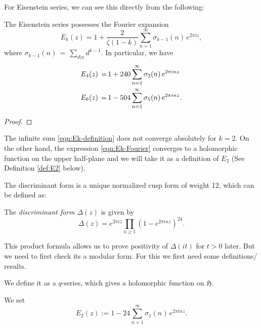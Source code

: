 For Eisenstein series, we can see this directly from the following:

\begin{lemma}\label{lemma:Ek-Fourier}\leanok
The Eisenstein series possesses the Fourier expansion
\begin{equation}\label{eqn:Ek-Fourier}E_k(z)=1+\frac{2}{\zeta(1-k)}\sum_{n=1}^\infty \sigma_{k-1}(n)\,e^{2\pi i z}, \end{equation}
where $\sigma_{k-1}(n)\,=\,\sum_{d|n} d^{k-1}$. In particular, we have
\begin{align}
  E_4(z)\,=\,& 1+240\sum_{n=1}^\infty \sigma_3(n)\,e^{2\pi i n z} \notag \\
  E_6(z)\,=\,& 1-504\sum_{n=1}^\infty \sigma_5(n)\,e^{2\pi i n z}. \notag
\end{align}
\end{lemma}

\begin{proof}
\leanok
\end{proof}

The infinite sum \eqref{eqn:Ek-definition} does not converge absolutely for $k=2$.
On the other hand, the expression \eqref{eqn:Ek-Fourier} converges to a holomorphic function on the upper half-plane and we will take it as a definition of $E_2$ (See Definition \ref{def:E2} below).


The discriminant form is a unique normalized cusp form of weight 12, which can be defined as:
\begin{definition}\label{def:disc-definition}\leanok{}
The \emph{discriminant form} $\Delta(z)$ is given by
\begin{equation}\label{eqn:disc-definition}
\Delta(z) = e^{2 \pi i z} \prod_{n \ge 1} (1 - e^{2 \pi i n z})^{24}.
\end{equation}
\end{definition}

This product formula allows us to prove positivity of $\Delta(it)$ for $t > 0$ later. But we need to first check its a modular form. For this we first need some definitions/ results.

We define it as a $q$-series, which gives a holomorphic function on $\mathfrak{H}$.
\begin{definition}\label{def:E2}\leanok
We set
\begin{equation}\label{eqn:E2}
    E_2(z):= 1-24\sum_{n=1}^\infty \sigma_1(n)\,e^{2\pi i n z}.
\end{equation}
\end{definition}

